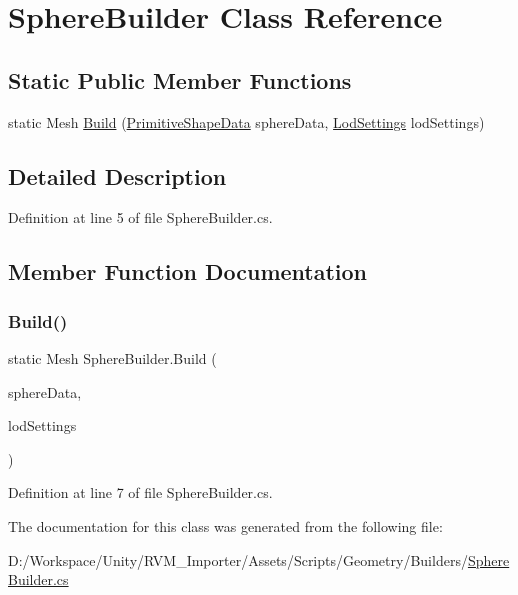 \hypertarget{class_sphere_builder}{}\section{Sphere\+Builder Class Reference}
\label{class_sphere_builder}
\subsection*{Static Public Member Functions}
\begin{DoxyCompactItemize}
\item 
static Mesh \mbox{\hyperlink{class_sphere_builder_a51642e9e2dc154444a8e2dfa35c0c02e}{Build}} (\mbox{\hyperlink{class_primitive_shape_data}{Primitive\+Shape\+Data}} sphere\+Data, \mbox{\hyperlink{class_lod_settings}{Lod\+Settings}} lod\+Settings)
\end{DoxyCompactItemize}


\subsection{Detailed Description}


Definition at line 5 of file Sphere\+Builder.\+cs.



\subsection{Member Function Documentation}
\mbox{\label{class_sphere_builder_a51642e9e2dc154444a8e2dfa35c0c02e}} 
\subsubsection{\texorpdfstring{Build()}{Build()}}
{\footnotesize\ttfamily static Mesh Sphere\+Builder.\+Build (\begin{DoxyParamCaption}\item[{\mbox{\hyperlink{class_primitive_shape_data}{Primitive\+Shape\+Data}}}]{sphere\+Data,  }\item[{\mbox{\hyperlink{class_lod_settings}{Lod\+Settings}}}]{lod\+Settings }\end{DoxyParamCaption})\hspace{0.3cm}{\ttfamily [static]}}



Definition at line 7 of file Sphere\+Builder.\+cs.



The documentation for this class was generated from the following file\+:\begin{DoxyCompactItemize}
\item 
D\+:/\+Workspace/\+Unity/\+R\+V\+M\+\_\+\+Importer/\+Assets/\+Scripts/\+Geometry/\+Builders/\mbox{\hyperlink{_sphere_builder_8cs}{Sphere\+Builder.\+cs}}\end{DoxyCompactItemize}
